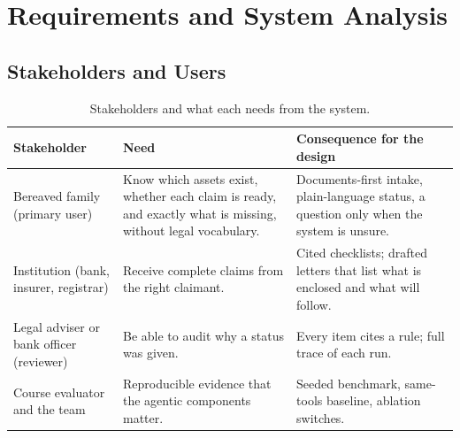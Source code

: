 \documentclass[12pt,a4paper,oneside]{report}
\begin{document}
\chapter{Requirements and System Analysis}
\section{Stakeholders and Users}
\begin{table}[H]
\centering\small{}
\caption{Stakeholders and what each needs from the system.}\label{tab:stake}
\renewcommand{\arraystretch}{1.15}
\begin{tabularx}{\linewidth}{@{}p{3.2cm}X X@{}}
\toprule
\textbf{Stakeholder} & \textbf{Need} & \textbf{Consequence for the design} \\ \midrule
Bereaved family (primary user) & Know which assets exist, whether each claim is ready, and exactly what is missing, without legal vocabulary. & Documents-first intake, plain-language status, a question only when the system is unsure. \\
Institution (bank, insurer, registrar) & Receive complete claims from the right claimant. & Cited checklists; drafted letters that list what is enclosed and what will follow. \\
Legal adviser or bank officer (reviewer) & Be able to audit why a status was given. & Every item cites a rule; full trace of each run. \\
Course evaluator and the team & Reproducible evidence that the agentic components matter. & Seeded benchmark, same-tools baseline, ablation switches. \\ \bottomrule
\end{tabularx}
\end{table}
\end{document}
